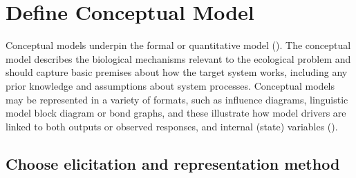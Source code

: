 \documentclass[
]{article}
\begin{document}
\section{Define Conceptual Model}\label{define-conceptual-model}

\begin{tcolorbox}[enhanced jigsaw, opacitybacktitle=0.6, bottomrule=.15mm, leftrule=.75mm, rightrule=.15mm, colbacktitle=quarto-callout-note-color!10!white, toprule=.15mm, titlerule=0mm, left=2mm, colframe=quarto-callout-note-color-frame, breakable, title=\textcolor{quarto-callout-note-color}{\faInfo}\hspace{0.5em}{Explanation}, opacityback=0, coltitle=black, bottomtitle=1mm, colback=white, toptitle=1mm, arc=.35mm]

Conceptual models underpin the formal or quantitative model
(). The
conceptual model describes the biological mechanisms relevant to the
ecological problem and should capture basic premises about how the
target system works, including any prior knowledge and assumptions about
system processes. Conceptual models may be represented in a variety of
formats, such as influence diagrams, linguistic model block diagram or
bond graphs, and these illustrate how model drivers are linked to both
outputs or observed responses, and internal (state) variables
().

\end{tcolorbox}

\subsection{Choose elicitation and representation
method}\label{choose-elicitation-and-representation-method}
\end{document}
